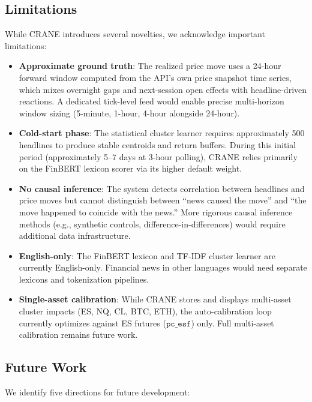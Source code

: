\subsection{Limitations}

While CRANE introduces several novelties, we acknowledge important limitations:

\begin{itemize}
    \item \textbf{Approximate ground truth}: The realized price move uses a 24-hour forward window computed from the API's own price snapshot time series, which mixes overnight gaps and next-session open effects with headline-driven reactions. A dedicated tick-level feed would enable precise multi-horizon window sizing (5-minute, 1-hour, 4-hour alongside 24-hour).

    \item \textbf{Cold-start phase}: The statistical cluster learner requires approximately 500 headlines to produce stable centroids and return buffers. During this initial period (approximately 5--7 days at 3-hour polling), CRANE relies primarily on the FinBERT lexicon scorer via its higher default weight.

    \item \textbf{No causal inference}: The system detects correlation between headlines and price moves but cannot distinguish between ``news caused the move'' and ``the move happened to coincide with the news.'' More rigorous causal inference methods (e.g., synthetic controls, difference-in-differences) would require additional data infrastructure.

    \item \textbf{English-only}: The FinBERT lexicon and TF-IDF cluster learner are currently English-only. Financial news in other languages would need separate lexicons and tokenization pipelines.

    \item \textbf{Single-asset calibration}: While CRANE stores and displays multi-asset cluster impacts (ES, NQ, CL, BTC, ETH), the auto-calibration loop currently optimizes against ES futures ($\texttt{pc\_esf}$) only. Full multi-asset calibration remains future work.
\end{itemize}

\subsection{Future Work}

We identify five directions for future development:

